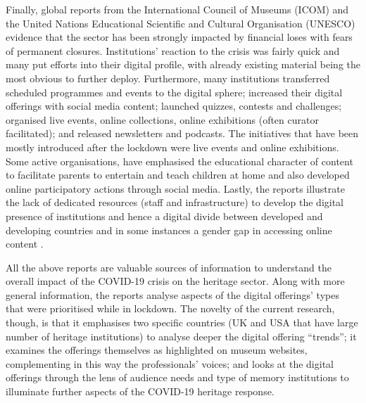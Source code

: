 \documentclass{egpubl}
\begin{document}
Finally, global reports from the International Council of Museums (ICOM) and the United Nations Educational Scientific and Cultural Organisation (UNESCO) evidence that the sector has been strongly impacted by financial loses with fears of permanent closures. Institutions' reaction to the crisis was fairly quick and many put efforts into their digital profile, with already existing material being the most obvious to further deploy. Furthermore, many institutions transferred scheduled programmes and events to the digital sphere; increased their digital offerings with social media content; launched quizzes, contests and challenges; organised live events, online collections, online exhibitions (often curator facilitated); and released newsletters and podcasts. The initiatives that have  been mostly introduced after the lockdown were live events and online exhibitions. Some active organisations, have emphasised the educational character of content to facilitate parents to entertain and teach children at home and also developed online participatory actions through social media. Lastly, the reports illustrate the lack of dedicated resources (staff and infrastructure) to develop the digital presence of institutions and hence a digital divide between developed and developing countries and in some instances a gender gap in accessing online content \cite{UNESCO2020,InternationalCouncilofMuseums2020b}.

All the above reports are valuable sources of information to understand the overall impact of the COVID-19 crisis on the heritage sector. Along with more general information, the reports analyse aspects of the digital offerings' types that were prioritised while in lockdown. The novelty of the current research, though, is that it emphasises two specific countries (UK and USA that have large number of heritage institutions) to analyse deeper the digital offering ``trends''; it examines the offerings themselves as highlighted on museum websites, complementing in this way the professionals' voices; and looks at the digital offerings through the lens of audience needs and type of memory institutions to illuminate further aspects of the COVID-19 heritage response.

\end{document}
